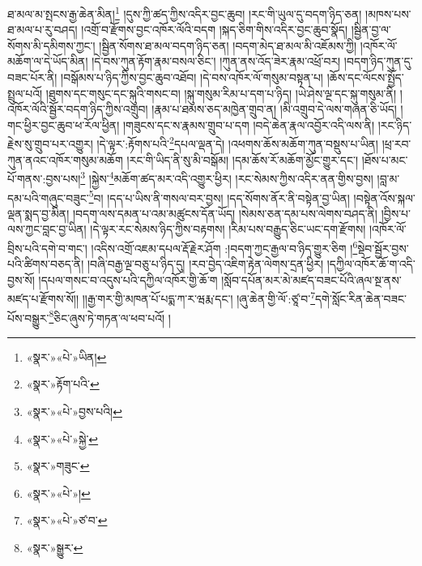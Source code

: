ཐ་མལ་མ་སྤངས་རྒྱ་ཆེན་མིན།\footnote{«སྣར་»«པེ་»ཡིན།} །དུས་ཀྱི་ཚད་ཀྱིས་འདིར་བྱང་ཆུབ། །རང་གི་ཡུལ་དུ་བདག་ཉིད་ཅན། །མཁས་པས་ཐ་མལ་པ་རུ་བཤད། །འགྲོ་བ་རྫོགས་བྱང་འཁོར་ལོའི་བདག །སྐད་ཅིག་གིས་འདིར་བྱང་ཆུབ་སྣོད། །སྦྱིན་བྱ་ལ་སོགས་མི་དམིགས་ཀྱང་། །སྦྱིན་སོགས་ཐ་མལ་བདག་ཉིད་ཅན། །བདག་མེད་ཐ་མལ་མི་འཇོམས་ཀྱི། །འཁོར་ལོ་མཆོག་ལ་དེ་ཡོད་མིན། །དེ་བས་ཀུན་རྟོག་རྣམ་བསལ་ཅིང་། །ཀུན་ནས་འོད་ཟེར་རྣམ་འཕྲོ་བར། །བདག་ཉིད་ཀུན་དུ་བཟང་པོར་ནི། །བསྒོམས་པ་ཉིད་ཀྱིས་བྱང་ཆུབ་འཐོབ། །དེ་བས་འཁོར་ལོ་གསུམ་བསྟན་པ། །ཆོས་དང་ལོངས་སྤྱོད་སྤྲུལ་པའོ། །ཐུགས་དང་གསུང་དང་སྐུའི་གསང་བ། །སྐུ་གསུམ་རིམ་པ་དག་པ་ཉིད། །ཡེ་ཤེས་ལྔ་དང་སྐུ་གསུམ་ནི། །འཁོར་ལོའི་སྦྱོར་བདག་ཉིད་ཀྱིས་འགྲུབ། །རྣམ་པ་ཐམས་ཅད་མཁྱེན་གྲུབ་ན། །མི་འགྲུབ་དེ་ལས་གཞན་ཅི་ཡོད། །གང་ཕྱིར་བྱང་ཆུབ་ཕ་རོལ་ཕྱིན། །གཟུངས་དང་ས་རྣམས་གྲུབ་པ་དག །བདེ་ཆེན་རྣལ་འབྱོར་འདི་ལས་ནི། །རང་ཉིད་རྗེས་སུ་གྲུབ་པར་འགྱུར། །དེ་ལྟར་:རྟོགས་པའི་\footnote{«སྣར་»རྟོག་པའི་}དཔལ་ལྡན་དེ། །འཕགས་ཆོས་མཆོག་ཀུན་བསྡུས་པ་ཡིན། །ཕྲ་རབ་ཀུན་ནའང་འཁོར་གསུམ་མཆོག །རང་གི་ཡིད་ནི་སུ་མི་བསྒོམ། །དམ་ཆོས་རོ་མཆོག་མྱོང་གྱུར་དང་། །ཐོས་པ་མང་པོ་གནས་:བྱས་པས།\footnote{«སྣར་»«པེ་»བྱས་པའི།} །སྐྱེས་\footnote{«སྣར་»«པེ་»སྐྱེ་}མཆོག་ཚད་མར་འདི་འགྱུར་ཕྱིར། །རང་སེམས་ཀྱིས་འདིར་ནན་གྱིས་བྱས། །བླ་མ་དམ་པའི་གཞུང་བཟུང་\footnote{«སྣར་»གཟུང་}བ། །དད་པ་ཡིས་ནི་གསལ་བར་བྱས། །དད་སོགས་ནོར་ནི་བསྟེན་བྱ་ཡིན། །བསྟེན་འོས་སྐལ་ལྡན་སྨད་བྱ་མིན། །བདག་ལས་དམན་པ་འམ་མཚུངས་དོན་ཡོད། །སེམས་ཅན་དམ་པས་ལེགས་བཤད་ནི། །བྱིས་པ་ལས་ཀྱང་བླང་བྱ་ཡིན། །དེ་ལྟར་རང་སེམས་ཉིད་ཀྱིས་བརྟགས། །རིམ་པས་བརྒྱུད་ཅིང་ཡང་དག་རྫོགས། །འཁོར་ལོ་བྲིས་པའི་དགེ་བ་གང་། །འདིས་འགྲོ་འཇམ་དཔལ་རྡོ་རྗེར་ཤོག :།བདག་ཀྱང་རྒྱལ་བ་ཉིད་གྱུར་ཅིག །\footnote{«སྣར་»«པེ་»།}སྡེབ་སྦྱོར་བྱས་པའི་ཚིགས་བཅད་ནི། །བཞི་བརྒྱ་ལྔ་བཅུ་པ་ཉིད་དུ། །རབ་བྱེད་འཇིག་རྟེན་ལེགས་དྲན་ཕྱིར། །དཀྱིལ་འཁོར་ཆོ་ག་འདི་བྱས་སོ། །དཔལ་གསང་བ་འདུས་པའི་དཀྱིལ་འཁོར་གྱི་ཆོ་ག །སློབ་དཔོན་མར་མེ་མཛད་བཟང་པོའི་ཞལ་སྔ་ནས་མཛད་པ་རྫོགས་སོ།། །།རྒྱ་གར་གྱི་མཁན་པོ་པདྨ་ཀ་ར་ཝརྨ་དང་། །ཞུ་ཆེན་གྱི་ལོ་:ཙཱ་བ་\footnote{«སྣར་»«པེ་»ཙ་བ་}དགེ་སློང་རིན་ཆེན་བཟང་པོས་བསྒྱུར་\footnote{«སྣར་»སྒྱུར་}ཅིང་ཞུས་ཏེ་གཏན་ལ་ཕབ་པའོ། ། 